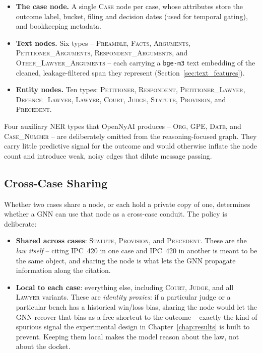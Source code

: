 \begin{sloppypar}
\begin{itemize}
  \item \textbf{The case node.} A single \textsc{Case} node per case,
    whose attributes store the outcome label, bucket, filing and
    decision dates (used for temporal gating), and bookkeeping
    metadata.
  \item \textbf{Text nodes.} Six types -- \textsc{Preamble},
    \textsc{Facts}, \textsc{Arguments},
    \textsc{Petitioner\_Arguments}, \textsc{Respondent\_Arguments},
    and \textsc{Other\_Lawyer\_Arguments} -- each carrying a
    \texttt{bge-m3} text embedding of the cleaned, leakage-filtered
    span they represent (Section~\ref{sec:text_features}).
  \item \textbf{Entity nodes.} Ten types: \textsc{Petitioner},
    \textsc{Respondent}, \textsc{Petitioner\_Lawyer},
    \textsc{Defence\_Lawyer}, \textsc{Lawyer}, \textsc{Court},
    \textsc{Judge}, \textsc{Statute}, \textsc{Provision}, and
    \textsc{Precedent}.
\end{itemize}
\end{sloppypar}

Four auxiliary NER types that OpenNyAI produces -- \textsc{Org},
\textsc{GPE}, \textsc{Date}, and \textsc{Case\_Number} -- are
deliberately omitted from the reasoning-focused graph. They carry
little predictive signal for the outcome and would otherwise inflate
the node count and introduce weak, noisy edges that dilute message
passing.

\subsection{Cross-Case Sharing}

Whether two cases share a node, or each hold a private copy of one,
determines whether a GNN can use that node as a cross-case conduit.
The policy is deliberate:

\begin{itemize}
  \item \textbf{Shared across cases}: \textsc{Statute},
    \textsc{Provision}, and \textsc{Precedent}. These are the
    \emph{law itself} -- citing IPC~420 in one case and IPC~420 in
    another is meant to be the same object, and sharing the node is
    what lets the GNN propagate information along the citation.
  \item \textbf{Local to each case}: everything else, including
    \textsc{Court}, \textsc{Judge}, and all \textsc{Lawyer}
    variants. These are \emph{identity proxies}: if a particular
    judge or a particular bench has a historical win/loss bias,
    sharing the node would let the GNN recover that bias as a free
    shortcut to the outcome -- exactly the kind of spurious signal
    the experimental design in Chapter~\ref{chap:results} is built
    to prevent. Keeping them local makes the model reason about the
    law, not about the docket.
\end{itemize}

